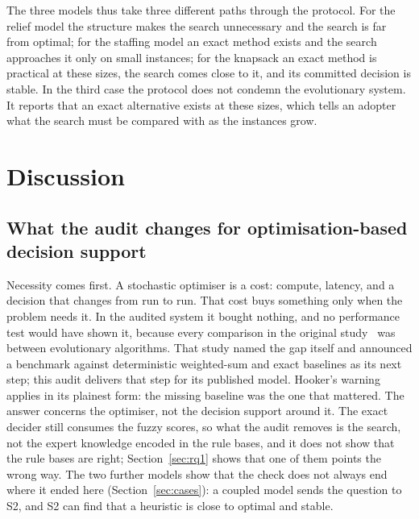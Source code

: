 \documentclass[systems,article,submit,moreauthors,pdftex]{Definitions/mdpi}
\begin{document}
The three models thus take three different paths through the protocol. For the relief model the
structure makes the search unnecessary and the search is far from optimal; for the staffing model
an exact method exists and the search approaches it only on small instances; for the knapsack an
exact method is practical at these sizes, the search comes close to it, and its committed
decision is stable. In the third case the protocol does not condemn the evolutionary system. It
reports that an exact alternative exists at these sizes, which tells an adopter what the search
must be compared with as the instances grow.

\section{Discussion}\label{sec:discussion}

\subsection{What the audit changes for optimisation-based decision support}
Necessity comes first. A stochastic optimiser is a cost: compute, latency, and a decision
that changes from run to run. That cost buys something only when the problem needs it. In the
audited system it bought nothing, and no performance test would have shown it, because every
comparison in the original study~\cite{rabiei2026resilient} was between evolutionary algorithms.
That study named the gap itself and announced a benchmark against deterministic weighted-sum and
exact baselines as its next step; this audit delivers that step for its published model.
Hooker's warning~\cite{hooker1995testing} applies in its plainest form: the missing baseline was
the one that mattered. The answer concerns the optimiser, not the decision support around it.
The exact decider still consumes the fuzzy scores, so what the audit removes is the search, not
the expert knowledge encoded in the rule bases, and it does not show that the rule bases are
right; Section~\ref{sec:rq1} shows that one of them points the wrong way. The two further models
show that the check does not always end where it ended here (Section~\ref{sec:cases}): a coupled
model sends the question to S2, and S2 can find that a heuristic is close to optimal and stable.
\end{document}
